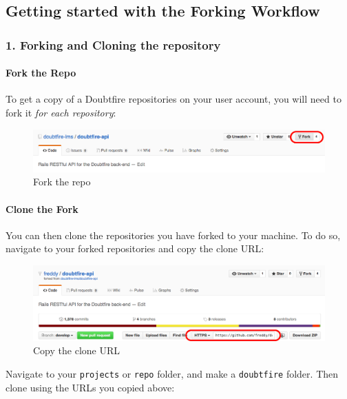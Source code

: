\documentclass[12pt,a4paper,]{article}
\let\oldparagraph\paragraph
\renewcommand{\paragraph}[1]{\oldparagraph{#1}\mbox{}}
\begin{document}
\hypertarget{getting-started-with-the-forking-workflow}{\subsection{Getting
started with the Forking
Workflow}\label{getting-started-with-the-forking-workflow}}

\subsubsection{1. Forking and Cloning the
repository}\label{forking-and-cloning-the-repository}

\paragraph{Fork the Repo}\label{fork-the-repo}

To get a copy of a Doubtfire repositories on your user account, you will
need to fork it \emph{for each repository}:

\begin{figure}[htbp]
\centering
\includegraphics{68e50046d2.png}
\caption{Fork the repo}
\end{figure}

\paragraph{Clone the Fork}\label{clone-the-fork}

You can then clone the repositories you have forked to your machine. To
do so, navigate to your forked repositories and copy the clone URL:

\begin{figure}[htbp]
\centering
\includegraphics{a360d7c755.png}
\caption{Copy the clone URL}
\end{figure}

Navigate to your \texttt{projects} or \texttt{repo} folder, and make a
\texttt{doubtfire} folder. Then clone using the URLs you copied above:
\end{document}
